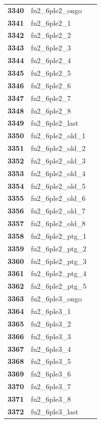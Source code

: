 \documentclass[
  letterpaper,
  DIV=11,
  numbers=noendperiod]{scrartcl}
\begin{document}
\begin{longtable}[t]{>{}cll}
\textbf{3340} & fu2\_6ple2\_ongo & \\
\addlinespace
\textbf{3341} & fu2\_6ple2\_1 & \\
\textbf{3342} & fu2\_6ple2\_2 & \\
\textbf{3343} & fu2\_6ple2\_3 & \\
\textbf{3344} & fu2\_6ple2\_4 & \\
\textbf{3345} & fu2\_6ple2\_5 & \\
\addlinespace
\textbf{3346} & fu2\_6ple2\_6 & \\
\textbf{3347} & fu2\_6ple2\_7 & \\
\textbf{3348} & fu2\_6ple2\_8 & \\
\textbf{3349} & fu2\_6ple2\_last & \\
\textbf{3350} & fu2\_6ple2\_old\_1 & \\
\addlinespace
\textbf{3351} & fu2\_6ple2\_old\_2 & \\
\textbf{3352} & fu2\_6ple2\_old\_3 & \\
\textbf{3353} & fu2\_6ple2\_old\_4 & \\
\textbf{3354} & fu2\_6ple2\_old\_5 & \\
\textbf{3355} & fu2\_6ple2\_old\_6 & \\
\addlinespace
\textbf{3356} & fu2\_6ple2\_old\_7 & \\
\textbf{3357} & fu2\_6ple2\_old\_8 & \\
\textbf{3358} & fu2\_6ple2\_ptg\_1 & \\
\textbf{3359} & fu2\_6ple2\_ptg\_2 & \\
\textbf{3360} & fu2\_6ple2\_ptg\_3 & \\
\addlinespace
\textbf{3361} & fu2\_6ple2\_ptg\_4 & \\
\textbf{3362} & fu2\_6ple2\_ptg\_5 & \\
\textbf{3363} & fu2\_6ple3\_ongo & \\
\textbf{3364} & fu2\_6ple3\_1 & \\
\textbf{3365} & fu2\_6ple3\_2 & \\
\addlinespace
\textbf{3366} & fu2\_6ple3\_3 & \\
\textbf{3367} & fu2\_6ple3\_4 & \\
\textbf{3368} & fu2\_6ple3\_5 & \\
\textbf{3369} & fu2\_6ple3\_6 & \\
\textbf{3370} & fu2\_6ple3\_7 & \\
\addlinespace
\textbf{3371} & fu2\_6ple3\_8 & \\
\textbf{3372} & fu2\_6ple3\_last & \\

\end{longtable}
\end{document}
